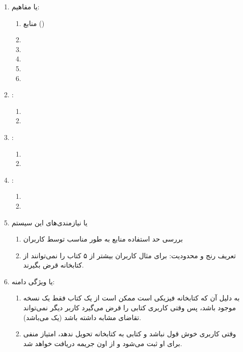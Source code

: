 \begin{enumerate}
    \item {} یا مفاهیم: \begin{enumerate}
        \item منابع ()
        \item {}
        \item {}
        \item {}
        \item {}
        \item {}
    \end{enumerate}
    \item {}: \begin{enumerate}
        \item {}
        \item {}
    \end{enumerate}
    \item {}: \begin{enumerate}
        \item {}
        \item {}
    \end{enumerate}
    \item {}: \begin{enumerate}
        \item {}
        \item {}
    \end{enumerate}
    \item {} یا نیازمندی‌های این سیستم \begin{enumerate}
        \item بررسی حد استفاده منابع به طور مناسب توسط کاربران
        \item تعریف رنج و محدودیت: برای مثال کاربران بیشتر از ۵ کتاب را
        نمی‌توانند از کتابخانه قرض بگیرند.
    \end{enumerate}
    \item {} یا ویژگی دامنه: \begin{enumerate}
        \item به دلیل آن که کتابخانه فیزیکی است ممکن است از یک کتاب فقط یک نسخه
        موجود باشد، پس وقتی کاربری کتابی را قرض می‌گیرد کاربر دیگر نمی‌تواند
        تقاضای مشابه داشته باشد (یک  می‌باشد).
        \item وقتی کاربری خوش قول نباشد و کتابی به کتابخانه تحویل ندهد، امتیاز
        منفی برای او ثبت می‌شود و از اون جریمه دریافت خواهد شد.
    \end{enumerate}
\end{enumerate}

